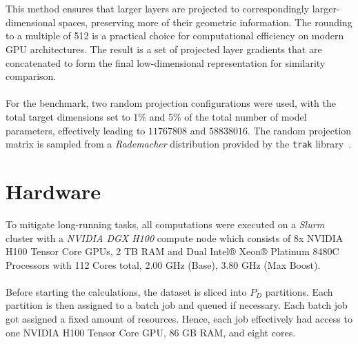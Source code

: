 \\\\
This method ensures that larger layers are projected to correspondingly larger-dimensional spaces, preserving more of their geometric information. The rounding to a multiple of 512 is a practical choice for computational efficiency on modern GPU architectures. The result is a set of projected layer gradients that are concatenated to form the final low-dimensional representation for similarity comparison.
\\\\
For the benchmark, two random projection configurations were used, with the total target
dimensions set to 1\% and 5\% of the total number of model parameters, effectively leading to $11767808$ and $58838016$. The random projection matrix is sampled from a \emph{Rademacher} distribution provided by the \texttt{trak} library~\cite{DBLP:conf/icml/ParkGILM23}.

\section{Hardware}\label{sec:hardware}
To mitigate long-running tasks, all computations were executed on a \emph{Slurm} cluster with a \emph{NVIDIA DGX H100} compute node which consists of 8x NVIDIA H100 Tensor Core GPUs, 2 TB RAM and Dual Intel® Xeon® Platinum 8480C Processors with
112 Cores total, 2.00 GHz (Base), 3.80 GHz (Max Boost). 
\\\\
Before starting the calculations, the dataset is sliced into $P_D$ partitions. Each partition is then assigned to a batch job and queued if necessary. Each batch job got assigned a fixed amount of resources. Hence, each job effectively had access to one NVIDIA H100 Tensor Core GPU, 86 GB RAM, and eight cores.